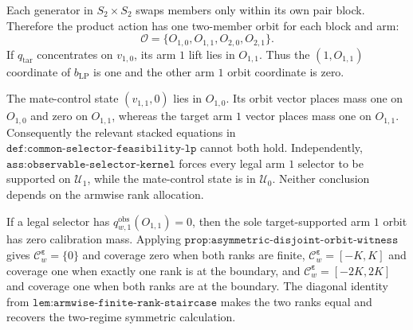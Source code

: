 Each generator in \(S_2\times S_2\) swaps members only within its own pair block. Therefore the product action has one two-member orbit for each block and arm:
\[
\mathcal O=\{O_{1,0},O_{1,1},O_{2,0},O_{2,1}\}.
\tag{1}
\]
If \(q_{\mathrm{tar}}\) concentrates on \(v_{1,0}\), its arm \(1\) lift lies in \(O_{1,1}\). Thus the \((1,O_{1,1})\) coordinate of \(b_{\mathrm{LP}}\) is one and the other arm \(1\) orbit coordinate is zero.

The mate-control state \((v_{1,1},0)\) lies in \(O_{1,0}\). Its orbit vector places mass one on \(O_{1,0}\) and zero on \(O_{1,1}\), whereas the target arm \(1\) vector places mass one on \(O_{1,1}\). Consequently the relevant stacked equations in \(\texttt{def:common-selector-feasibility-lp}\) cannot both hold. Independently, \(\texttt{ass:observable-selector-kernel}\) forces every legal arm \(1\) selector to be supported on \(\mathcal U_1\), while the mate-control state is in \(\mathcal U_0\). Neither conclusion depends on the armwise rank allocation.

If a legal selector has \(q^{\mathrm{obs}}_{w,1}(O_{1,1})=0\), then the sole target-supported arm \(1\) orbit has zero calibration mass. Applying \(\texttt{prop:asymmetric-disjoint-orbit-witness}\) gives \(\mathcal C^{\boldsymbol\varepsilon}_w=\{0\}\) and coverage zero when both ranks are finite, \(\mathcal C^{\boldsymbol\varepsilon}_w=[-K,K]\) and coverage one when exactly one rank is at the boundary, and \(\mathcal C^{\boldsymbol\varepsilon}_w=[-2K,2K]\) and coverage one when both ranks are at the boundary. The diagonal identity from \(\texttt{lem:armwise-finite-rank-staircase}\) makes the two ranks equal and recovers the two-regime symmetric calculation.